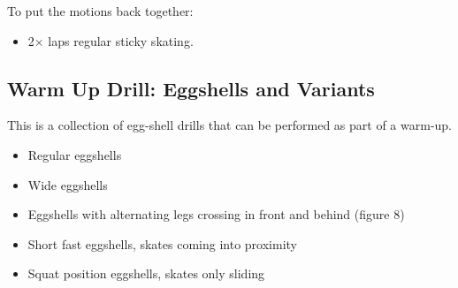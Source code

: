 To put the motions back together:
\begin{itemize}
    \item 2$\times$ laps regular sticky skating. 
\end{itemize}


\subsection*{Warm Up Drill: Eggshells and Variants}

This is a collection of egg-shell drills that can be performed as part of a warm-up. 

\begin{itemize}
    \item Regular eggshells  
    \item Wide eggshells
    \item Eggshells with alternating legs crossing in front and behind (figure 8) 
    \item Short fast eggshells, skates coming into proximity 
    \item Squat position eggshells, skates only sliding    
\end{itemize}
